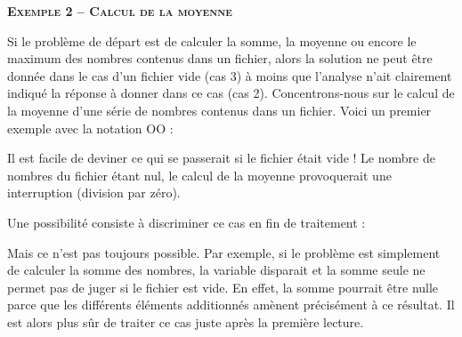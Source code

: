 {\sffamily\bfseries\scshape
Exemple 2 – Calcul de la moyenne}

Si le problème de départ est de calculer la somme, la moyenne ou encore
le maximum des nombres contenus dans un fichier, alors la solution ne
peut être donnée dans le cas d'un fichier vide (cas 3)
à moins que l'analyse n'ait
clairement indiqué la réponse à donner dans ce cas (cas 2).
Concentrons-nous sur le calcul de la moyenne d’une série de nombres
contenus dans un fichier. Voici un premier exemple avec la notation OO
:



Il est facile de deviner ce qui se passerait si le fichier était vide !
Le nombre de nombres du fichier étant nul, le calcul de la moyenne
provoquerait une interruption (division par zéro).


Une possibilité consiste à discriminer ce cas en fin de traitement :


Mais ce n'est pas toujours possible. Par exemple, si le
problème est simplement de calculer la somme des nombres, la variable
 disparait et la somme seule ne permet pas de
juger si le fichier est vide. En effet, la somme pourrait être nulle
parce que les différents éléments additionnés amènent précisément à ce
résultat. Il est alors plus sûr de traiter ce cas juste après la
première lecture.

